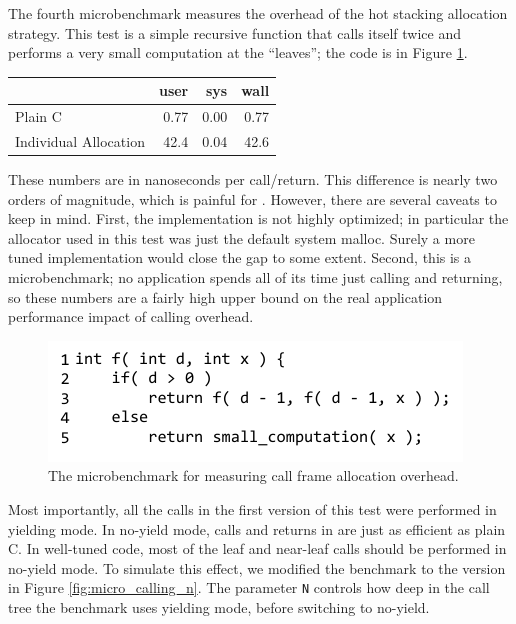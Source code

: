 \documentclass[9pt,preprint]{sigplanconf}
\begin{document}
The fourth microbenchmark measures the overhead of the hot stacking allocation strategy.
This test is a simple recursive function that calls itself twice and performs a very small computation at the ``leaves''; the code is in Figure \ref{fig:micro_calling}.

\vspace{1em}
\begin{tabular}{|l|r|r|r|}
  \hline
   & user & sys & wall \\
  \hline
  \hline
  Plain C & 0.77 & 0.00 & 0.77 \\
  \hline
  Individual Allocation & 42.4 & 0.04 & 42.6 \\
  \hline
\end{tabular}
\vspace{1em}

These numbers are in nanoseconds per call/return.
This difference is nearly two orders of magnitude, which is painful for \charcoal{}.
However, there are several caveats to keep in mind.
First, the \charcoal{} implementation is not highly optimized; in particular the allocator used in this test was just the default system malloc.
Surely a more tuned implementation would close the gap to some extent.
Second, this is a microbenchmark; no application spends all of its time just calling and returning, so these numbers are a fairly high upper bound on the real application performance impact of calling overhead.

\begin{figure}
\includegraphics{just_calling_benchmark}
\caption{The microbenchmark for measuring call frame allocation overhead.}
\label{fig:micro_calling}
\end{figure}

Most importantly, all the calls in the first version of this test were performed in yielding mode.
In no-yield mode, calls and returns in \charcoal{} are just as efficient as plain C.
In well-tuned \charcoal{} code, most of the leaf and near-leaf calls should be performed in no-yield mode.
To simulate this effect, we modified the benchmark to the version in Figure \ref{fig:micro_calling_n}.
The parameter \texttt{N} controls how deep in the call tree the benchmark uses yielding mode, before switching to no-yield.
\end{document}
